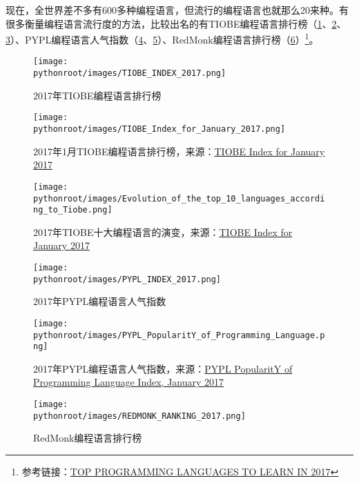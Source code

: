 现在，全世界差不多有600多种编程语言，但流行的编程语言也就那么20来种。有很多衡量编程语言流行度的方法，比较出名的有TIOBE编程语言排行榜（\ref{fig:TIOBE_INDEX_2017}、\ref{fig:TIOBE_Index_for_January_2017}、\ref{fig:TIOBE_Top10_LANGUAGE_EVOLUTION}）、PYPL编程语言人气指数（\ref{fig:PYPL_INDEX_2017}、\ref{fig:PYPL_PopularitY_of_Programming_Language}）、RedMonk编程语言排行榜（\ref{fig:REDMONK_RANKING_2017}）\footnote{参考链接：\href{https://www.codingame.com/blog/top-programming-languages-to-learn-in-2017/}{TOP PROGRAMMING LANGUAGES TO LEARN IN 2017}}。

\begin{figure}[ht]
  \centering
  \texttt{[image: \\pythonroot/images/TIOBE\_INDEX\_2017.png]}
  \caption{2017年TIOBE编程语言排行榜}
  \label{fig:TIOBE_INDEX_2017}
\end{figure}

\begin{figure}[ht]
  \centering
  \texttt{[image: \\pythonroot/images/TIOBE\_Index\_for\_January\_2017.png]}
  \caption{2017年1月TIOBE编程语言排行榜，来源：\href{http://www.tiobe.com/tiobe-index//}{TIOBE Index for January 2017}}
  \label{fig:TIOBE_Index_for_January_2017}
\end{figure}

\begin{figure}[ht]
  \centering
  \texttt{[image: \\pythonroot/images/Evolution\_of\_the\_top\_10\_languages\_according\_to\_Tiobe.png]}
  \caption{2017年TIOBE十大编程语言的演变，来源：\href{http://www.tiobe.com/tiobe-index//}{TIOBE Index for January 2017}}
  \label{fig:TIOBE_Top10_LANGUAGE_EVOLUTION}
\end{figure}

\begin{figure}[ht]
  \centering
  \texttt{[image: \\pythonroot/images/PYPL\_INDEX\_2017.png]}
  \caption{2017年PYPL编程语言人气指数}
  \label{fig:PYPL_INDEX_2017}
\end{figure}

\begin{figure}[ht]
  \centering
  \texttt{[image: \\pythonroot/images/PYPL\_PopularitY\_of\_Programming\_Language.png]}
  \caption{2017年PYPL编程语言人气指数，来源：\href{http://pypl.github.io/PYPL.html}{PYPL PopularitY of Programming Language Index, January 2017}}
  \label{fig:PYPL_PopularitY_of_Programming_Language}
\end{figure}


\begin{figure}[ht]
  \centering
  \texttt{[image: \\pythonroot/images/REDMONK\_RANKING\_2017.png]}
  \caption{RedMonk编程语言排行榜}
  \label{fig:REDMONK_RANKING_2017}
\end{figure}

